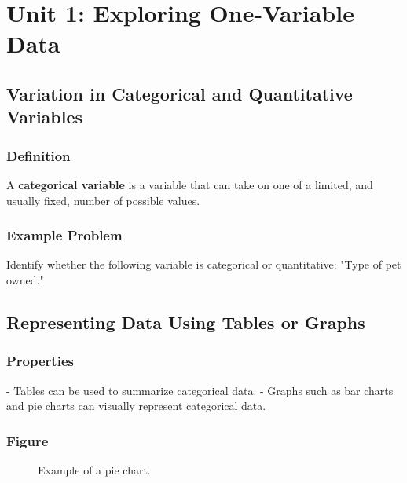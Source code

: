 
\tableofcontents

\section{Unit 1: Exploring One-Variable Data}
\subsection{Variation in Categorical and Quantitative Variables}
\subsubsection{Definition}
\begin{definition}
A \textbf{categorical variable} is a variable that can take on one of a limited, and usually fixed, number of possible values.
\end{definition}

\subsubsection{Example Problem}
\begin{example}
Identify whether the following variable is categorical or quantitative: "Type of pet owned."
\end{example}

\subsection{Representing Data Using Tables or Graphs}
\subsubsection{Properties}
\begin{properties}
- Tables can be used to summarize categorical data.
- Graphs such as bar charts and pie charts can visually represent categorical data.
\end{properties}

\subsubsection{Figure}
\begin{figure}[h!]
\centering
{}
\caption{Example of a pie chart.}
\end{figure}

